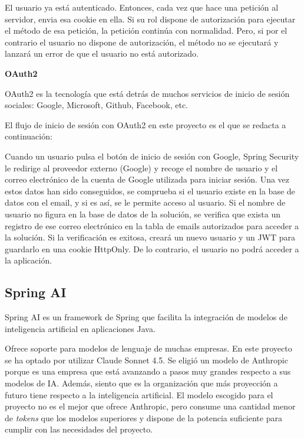 El usuario ya está autenticado. Entonces, cada vez que hace una petición al servidor, envia esa cookie en ella. Si su rol dispone de autorización para ejecutar el método de esa petición, la petición continúa con normalidad. Pero, si por el contrario el usuario no dispone de autorización, el método no se ejecutará y lanzará un error de que el usuario no está autorizado.

\textbf{OAuth2}

OAuth2 es la tecnología que está detrás de muchos servicios de inicio de sesión sociales: Google, Microsoft, Github, Facebook, etc.

El flujo de inicio de sesión con OAuth2 en este proyecto es el que se redacta a continuación:

Cuando un usuario pulsa el botón de inicio de sesión con Google, Spring Security le redirige al proveedor externo (Google) y recoge el nombre de usuario y el correo electrónico de la cuenta de Google utilizada para iniciar sesión. Una vez estos datos han sido conseguidos, se comprueba si el usuario existe en la base de datos con el email, y si es así, se le permite acceso al usuario. Si el nombre de usuario no figura en la base de datos de la solución, se verifica que exista un registro de ese correo electrónico en la tabla de emails autorizados para acceder a la solución. Si la verificación es exitosa, creará un nuevo usuario y un JWT para guardarlo en una cookie HttpOnly. De lo contrario, el usuario no podrá acceder a la aplicación.

\subsection{Spring AI}

Spring AI es un framework de Spring que facilita la integración de modelos de inteligencia artificial en aplicaciones Java. \cite{spring-ai}

Ofrece soporte para modelos de lenguaje de muchas empresas. En este proyecto se ha optado por utilizar Claude Sonnet 4.5. Se eligió un modelo de Anthropic porque es una empresa que está avanzando a pasos muy grandes respecto a sus modelos de IA. Además, siento que es la organización que más proyección a futuro tiene respecto a la inteligencia artificial. El modelo escogido para el proyecto no es el mejor que ofrece Anthropic, pero consume una cantidad menor de \textit{tokens} que los modelos superiores y dispone de la potencia suficiente para cumplir con las necesidades del proyecto.

